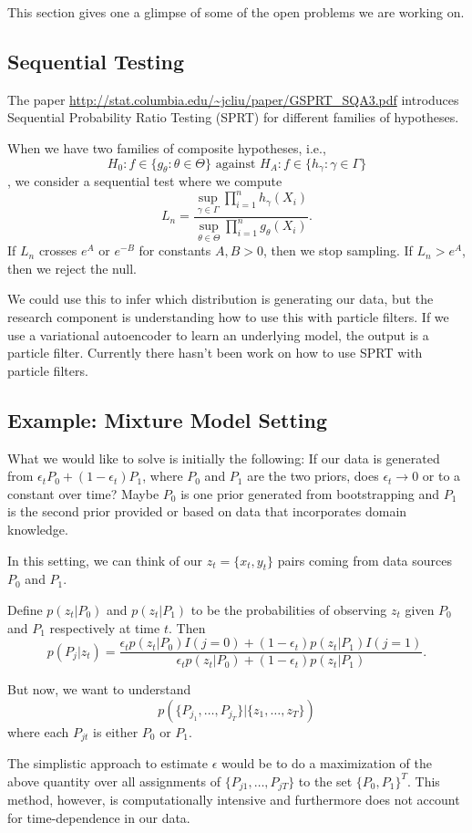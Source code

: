 \documentclass[english]{article}
\numberwithin{equation}{section}
\begin{document}
This section gives one a glimpse of some of the open problems we are working on.

\subsection*{Sequential Testing}
The paper \url{http://stat.columbia.edu/~jcliu/paper/GSPRT_SQA3.pdf} introduces Sequential Probability Ratio Testing (SPRT) for different families of hypotheses.

When we have two families of composite hypotheses, i.e.,
$$H_0: f\in \{g_{\theta}:\theta\in \Theta\} \textrm{ against } H_A:f\in \{h_{\gamma}:\gamma\in \Gamma\}$$, we consider a sequential test where we compute $$L_n = \frac{\sup_{\gamma\in \Gamma} \prod_{i=1}^n h_{\gamma}(X_i)}{\sup_{\theta\in \Theta} \prod_{i=1}^n g_{\theta}(X_i)}.$$ If $L_n$ crosses $e^A$ or $e^{-B}$ for constants $A,B>0$, then we stop sampling. If $L_n>e^A$, then we reject the null.

We could use this to infer which distribution is generating our data, but the research component is understanding how to use this with particle filters. If we use a variational autoencoder to learn an underlying model, the output is a particle filter. Currently there hasn't been work on how to use SPRT with particle filters.
\subsection*{Example: Mixture Model Setting}
What we would like to solve is initially the following:
If our data is generated from $\epsilon_t P_0 + (1-\epsilon_t) P_1$, where $P_0$ and $P_1$ are the two priors, does $\epsilon_t\to 0$ or to a constant over time? Maybe $P_0$ is one prior generated from bootstrapping and $P_1$ is the second prior provided or based on data that incorporates domain knowledge.

In this setting, we can think of our $z_t=\{x_t,y_t\}$ pairs coming from data sources $P_0$ and $P_1$.

Define $p(z_t|P_0)$ and $p(z_t|P_1)$ to be the probabilities of observing $z_t$ given $P_0$ and $P_1$ respectively at time $t$. Then $$p(P_j|z_t)=\frac{\epsilon_t p(z_t|P_0) I(j=0) + (1-\epsilon_t) p(z_t|P_1) I(j=1)}{\epsilon_t p(z_t|P_0) + (1-\epsilon_t) p(z_t|P_1)}.$$

But now, we want to understand
$$p(\{P_{j_1},\ldots,P_{j_T}\}|\{z_1,\ldots,z_T\})$$ where each $P_{jt}$ is either $P_0$ or $P_1$.

The simplistic approach to estimate $\epsilon$ would be to do a maximization of the above quantity over all assignments of $\{P_{j1},\ldots,P_{jT}\}$ to the set $\{P_0,P_1\}^T$. This method, however, is computationally intensive and furthermore does not account for time-dependence in our data.
\end{document}

